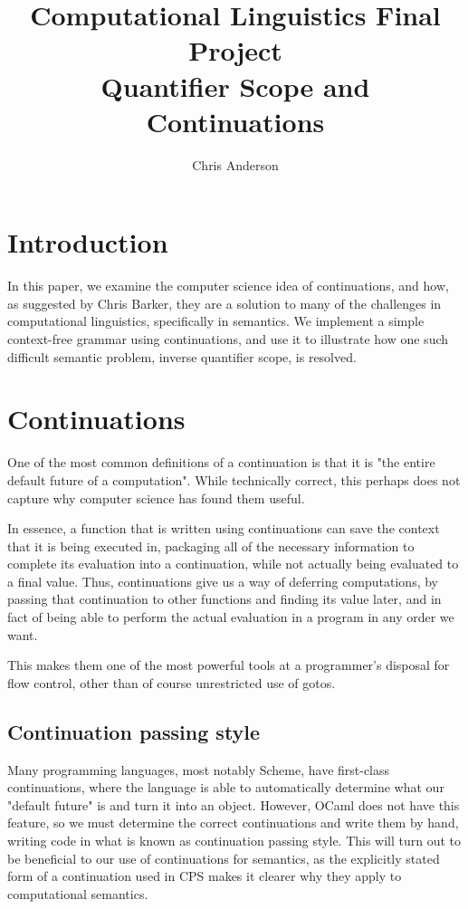 \documentclass[11pt]{article} %
\title{Computational Linguistics Final Project \\ Quantifier Scope and Continuations}
\author{Chris Anderson}
\begin{document}
\maketitle

\section{Introduction}

In this paper, we examine the computer science idea of continuations, and how, as suggested by Chris Barker, they are a solution to many of the challenges in computational linguistics, specifically in semantics. We implement a simple context-free grammar using continuations, and use it to illustrate how one such difficult semantic problem, inverse quantifier scope, is resolved.

\section{Continuations}

One of the most common definitions of a continuation is that it is "the entire default future of a computation". While technically correct, this perhaps does not capture why computer science has found them useful.

In essence, a function that is written using continuations can save the context that it is being executed in, packaging all of the necessary information to complete its evaluation into a continuation, while not actually being evaluated to a final value. Thus, continuations give us a way of deferring computations, by passing that continuation to other functions and finding its value later, and in fact of being able to perform the actual evaluation in a program in any order we want.

This makes them one of the most powerful tools at a programmer's disposal for flow control, other than of course unrestricted use of gotos.

\subsection{Continuation passing style}

Many programming languages, most notably Scheme, have first-class continuations, where the language is able to automatically determine what our "default future" is and turn it into an object. However, OCaml does not have this feature, so we must determine the correct continuations and write them by hand, writing code in what is known as continuation passing style. This will turn out to be beneficial to our use of continuations for semantics, as the explicitly stated form of a continuation used in CPS makes it clearer why they apply to computational semantics.
\end{document}
